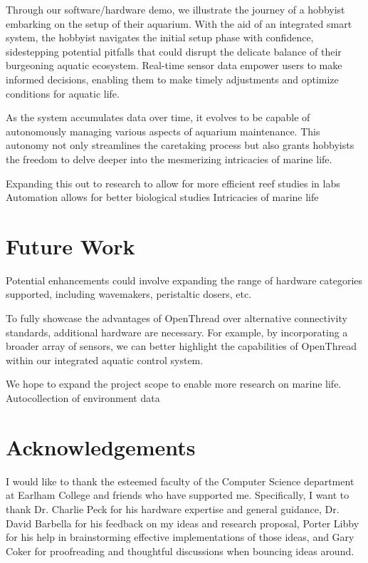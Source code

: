 \documentclass[8pt,twocolumn]{article}
\begin{document}
Through our software/hardware demo, we illustrate the journey of a hobbyist embarking on the setup of their aquarium. With the aid of an integrated smart system, the hobbyist navigates the initial setup phase with confidence, sidestepping potential pitfalls that could disrupt the delicate balance of their burgeoning aquatic ecosystem. Real-time sensor data empower users to make informed decisions, enabling them to make timely adjustments and optimize conditions for aquatic life.

As the system accumulates data over time, it evolves to be capable of autonomously managing various aspects of aquarium maintenance. This autonomy not only streamlines the caretaking process but also grants hobbyists the freedom to delve deeper into the mesmerizing intricacies of marine life.

Expanding this out to research to allow for more efficient reef studies in labs
Automation allows for better biological studies
Intricacies of marine life


\section{Future Work}

Potential enhancements could involve expanding the range of hardware categories supported, including wavemakers, peristaltic dosers, etc.

To fully showcase the advantages of OpenThread over alternative connectivity standards, additional hardware are necessary. For example, by incorporating a broader array of sensors, we can better highlight the capabilities of OpenThread within our integrated aquatic control system.

We hope to expand the project scope to enable more research on marine life. Autocollection of environment data 

\section{Acknowledgements}

I would like to thank the esteemed faculty of the Computer Science department at Earlham College and friends who have supported me. Specifically, I want to thank Dr. Charlie Peck for his hardware expertise and general guidance, Dr. David Barbella for his feedback on my ideas and research proposal, Porter Libby for his help in brainstorming effective implementations of those ideas, and Gary Coker for proofreading and thoughtful discussions when bouncing ideas around.



\end{document}
